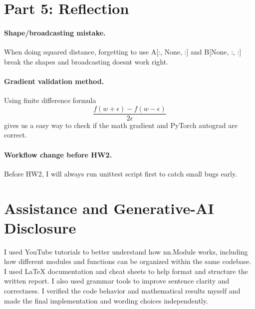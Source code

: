 \documentclass[11pt]{article}
\begin{document}
\section*{Part 5: Reflection}

\paragraph{Shape/broadcasting mistake.} When doing squared distance, forgetting to use A[:, None, :] and B[None, :, :] break the shapes and broadcasting doesnt work right.

\paragraph{Gradient validation method.} Using finite difference formula 
\[
\frac{f(w + \epsilon) - f(w - \epsilon)}{2\epsilon}
\]
 gives us a easy way to check if the math gradient and PyTorch autograd are correct.

\paragraph{Workflow change before HW2.} Before HW2, I will always run unittest script first to catch small bugs early.

\section*{Assistance and Generative-AI Disclosure}

I used YouTube tutorials to better understand how nn.Module works, including how different modules and functions can be organized within the same codebase. I used LaTeX documentation and cheat sheets to help format and structure the written report. I also used grammar tools to improve sentence clarity and correctness. I verified the code behavior and mathematical results myself and made the final implementation and wording choices independently.
\end{document}
